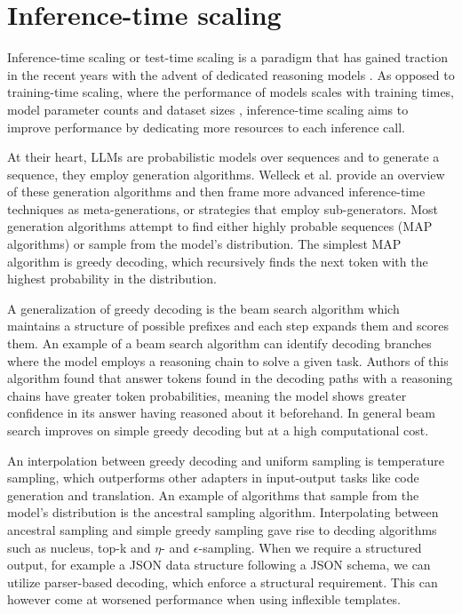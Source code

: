 \section{Inference-time scaling}
Inference-time scaling or test-time scaling is a paradigm that has gained traction in the recent years
with the advent of dedicated reasoning models . 
As opposed to training-time scaling, where the performance of models scales with 
training times, model parameter counts and dataset sizes ,
inference-time scaling aims to improve performance by dedicating more resources to each inference call.

At their heart, LLMs are probabilistic models over sequences and to generate a sequence, they employ generation algorithms. 
Welleck et al.\cite{welleck2024decodingmetagenerationinferencetimealgorithms} provide an overview of these generation algorithms
and then frame more advanced inference-time techniques as meta-generations, or strategies that employ sub-generators.
Most generation algorithms attempt to find either highly probable sequences (MAP algorithms) or sample from the model's distribution.
The simplest MAP algorithm is greedy decoding, which recursively finds the next token with the highest probability in the distribution.

A generalization of greedy decoding is the beam search algorithm which maintains a structure of possible prefixes and each step expands them and scores them.
An example of a beam search algorithm\cite{wang2024chainofthoughtreasoningprompting} can identify decoding branches where the model 
employs a reasoning chain to solve a given task. Authors of this algorithm found that answer tokens found in the decoding paths with a reasoning chains 
have greater token probabilities, meaning the model shows greater confidence in its answer having reasoned about it beforehand.
In general beam search improves on simple greedy decoding but at a high computational cost.

An interpolation between greedy decoding and uniform sampling is temperature sampling, which 
outperforms other adapters in input-output tasks like code generation and translation. 
An example of algorithms that sample from the model's distribution is the ancestral sampling algorithm.
Interpolating between ancestral sampling and simple greedy sampling gave rise to decding algorithms such as
nucleus, top-k and $\eta$- and $\epsilon$-sampling. When we require a structured output, for example a JSON data 
structure following a JSON schema, we can utilize parser-based decoding, which enforce a structural requirement.
This can however come at worsened performance when using inflexible templates.

